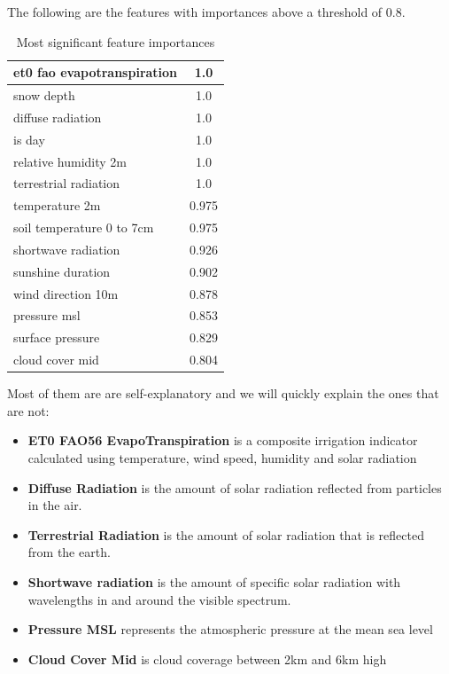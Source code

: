 \documentclass[12pt]{article}
\begin{document}
The following are the features with importances above a threshold of 0.8.

\begin{table}[h!]
\centering
\begin{tabular}{|l|c|}
\hline
et0 fao evapotranspiration   &  1.0  \\ \hline
snow depth                   &  1.0  \\ \hline
diffuse radiation            &  1.0  \\ \hline
is day                       &  1.0  \\ \hline
relative humidity 2m         &  1.0  \\ \hline
terrestrial radiation        &  1.0  \\ \hline
temperature 2m               &  0.975  \\ \hline
soil temperature 0 to 7cm    &  0.975  \\ \hline
shortwave radiation          &  0.926  \\ \hline
sunshine duration            &  0.902  \\ \hline
wind direction 10m           &  0.878  \\ \hline
pressure msl                 &  0.853  \\ \hline
surface pressure             &  0.829  \\ \hline
cloud cover mid              &  0.804  \\ \hline

\end{tabular}
\caption{Most significant feature importances}
\label{tab:Top_fint}
\end{table}

 Most of them are are self-explanatory and we will quickly explain the ones that are not:
\begin{itemize}
  \item \textbf{ET0 FAO56 EvapoTranspiration} is a composite irrigation indicator calculated using temperature, wind speed, humidity and solar radiation
  \item \textbf{Diffuse Radiation} is the amount of solar radiation reflected from particles in the air.
  \item \textbf{Terrestrial Radiation} is the amount of solar radiation that is reflected from the earth.
  \item \textbf{Shortwave radiation} is the amount of specific solar radiation with wavelengths in and around the visible spectrum.
  \item \textbf{Pressure MSL} represents the atmospheric pressure at the mean sea level
  \item \textbf{Cloud Cover Mid} is cloud coverage between 2km and 6km high
\end{itemize}
\end{document}
